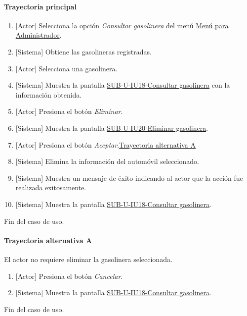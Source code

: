 \paragraph{Trayectoria principal}
	\begin{enumerate}
		\item {[Actor]} Selecciona la opción \textit{Consultar gasolinera} del menú \hyperref[fig:menu-admi]{Menú para Administrador}.
		\item {[Sistema]} Obtiene las gasolineras registradas.
		\item {[Actor]} Selecciona una gasolinera.
		\item {[Sistema]} Muestra la pantalla \hyperref[fig:sub-u-iu18]{SUB-U-IU18-Consultar gasolinera} con la información obtenida.
		\item {[Actor]} Presiona el botón \textit{Eliminar}.
		\item {[Sistema]} Muestra la pantalla \hyperref[fig:sub-u-iu20]{SUB-U-IU20-Eliminar gasolinera}.
		\item {[Actor]} Presiona el botón \textit{Aceptar}.\hyperref[SUB-U-CU20:TA]{Trayectoria alternativa A}
		\item {[Sistema]} Elimina la información del automóvil seleccionado.
		\item {[Sistema]} Muestra un mensaje de éxito indicando al actor que la acción fue realizada exitosamente.
		\item \label{SUB-U-CU13:Pantalla} {[Sistema]} Muestra la pantalla \hyperref[fig:sub-u-iu18]{SUB-U-IU18-Consultar gasolinera}.
	\end{enumerate}
	Fin del caso de uso.

\paragraph{Trayectoria alternativa A} \label{SUB-U-CU20:TA}
	El actor no requiere eliminar la gasolinera seleccionada.
	\begin{enumerate}[label=A\arabic*.]
		\item {[Actor]} Presiona el botón \textit{Cancelar}.
		\item {[Sistema]} Muestra la pantalla \hyperref[fig:sub-u-iu18]{SUB-U-IU18-Consultar gasolinera}.
	\end{enumerate}
	Fin del caso de uso.
